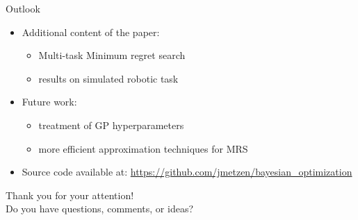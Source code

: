 \documentclass[11pt]{beamer}
\begin{document}
\begin{frame}{Outlook}
  
  \begin{itemize}
    \item Additional content of the paper:
    \begin{itemize}
      \item Multi-task Minimum regret search
      \item results on simulated robotic task
    \end{itemize}
    \pause
    \item Future work:
    \begin{itemize}
      \item treatment of GP hyperparameters
      \item more efficient approximation techniques for MRS
    \end{itemize}
    \pause
    \item Source code available at: \url{https://github.com/jmetzen/bayesian_optimization}
  \end{itemize}

  \vspace*{1.5cm}
  \pause
  \begin{center}
   Thank you for your attention! \\
   Do you have questions, comments, or ideas?
   \end{center}

\end{frame}
\end{document}
